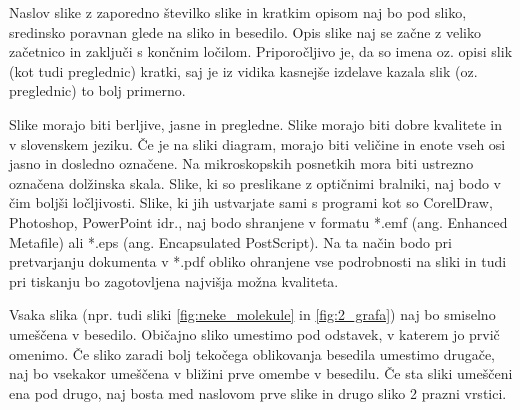 Naslov slike z zaporedno številko slike in kratkim opisom naj bo pod sliko, 
sredinsko poravnan glede na sliko in besedilo. Opis slike naj se začne z veliko 
začetnico in zaključi s končnim ločilom. Priporočljivo je, da so imena oz. 
opisi slik (kot tudi preglednic) kratki, saj je iz vidika kasnejše izdelave 
kazala slik (oz. preglednic) to bolj primerno.

Slike morajo biti berljive, jasne in pregledne. Slike morajo biti dobre 
kvalitete in v slovenskem jeziku. Če je na sliki diagram, morajo biti veličine 
in enote vseh osi jasno in dosledno označene. Na mikroskopskih posnetkih mora 
biti ustrezno označena dolžinska skala. Slike, ki so preslikane z optičnimi 
bralniki, naj bodo v čim boljši ločljivosti. Slike, ki jih ustvarjate sami s 
programi kot so CorelDraw, Photoshop, PowerPoint idr., naj bodo shranjene v 
formatu *.emf (ang. Enhanced Metafile) ali *.eps (ang. Encapsulated 
PostScript). Na ta način bodo pri pretvarjanju dokumenta v *.pdf obliko 
ohranjene vse podrobnosti na sliki in tudi pri tiskanju bo zagotovljena 
najvišja možna kvaliteta.

Vsaka slika (npr. tudi sliki \ref{fig:neke_molekule} in \ref{fig:2_grafa}) naj 
bo smiselno umeščena v besedilo. Običajno sliko umestimo pod odstavek, v 
katerem jo prvič omenimo. Če sliko zaradi bolj tekočega oblikovanja besedila 
umestimo drugače, naj bo vsekakor umeščena v bližini prve omembe v besedilu. Če 
sta sliki umeščeni ena pod drugo, naj bosta med naslovom prve slike in drugo 
sliko 2 prazni vrstici.

